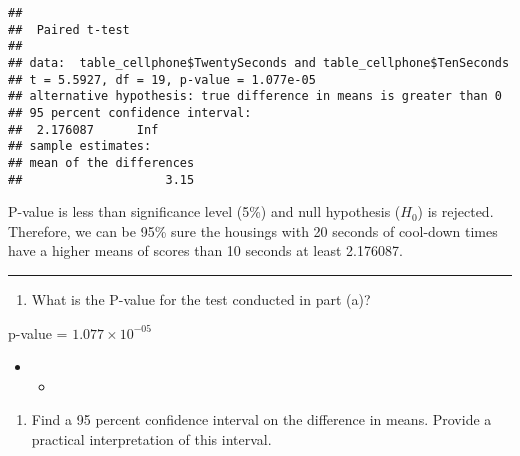 \documentclass[]{article}
\newenvironment{Shaded}{\begin{snugshade}}{\end{snugshade}}
\newcommand{\DataTypeTok}[1]{\textcolor[rgb]{0.13,0.29,0.53}{#1}}
\newcommand{\DecValTok}[1]{\textcolor[rgb]{0.00,0.00,0.81}{#1}}
\newcommand{\FloatTok}[1]{\textcolor[rgb]{0.00,0.00,0.81}{#1}}
\newcommand{\KeywordTok}[1]{\textcolor[rgb]{0.13,0.29,0.53}{\textbf{#1}}}
\newcommand{\NormalTok}[1]{#1}
\newcommand{\OperatorTok}[1]{\textcolor[rgb]{0.81,0.36,0.00}{\textbf{#1}}}
\newcommand{\StringTok}[1]{\textcolor[rgb]{0.31,0.60,0.02}{#1}}
\providecommand{\tightlist}{%
  \setlength{\itemsep}{0pt}\setlength{\parskip}{0pt}}
\begin{document}
\begin{Shaded}
\end{Shaded}

\begin{verbatim}
## 
##  Paired t-test
## 
## data:  table_cellphone$TwentySeconds and table_cellphone$TenSeconds
## t = 5.5927, df = 19, p-value = 1.077e-05
## alternative hypothesis: true difference in means is greater than 0
## 95 percent confidence interval:
##  2.176087      Inf
## sample estimates:
## mean of the differences 
##                    3.15
\end{verbatim}

P-value is less than significance level (5\%) and null hypothesis
(\(H_0\)) is rejected. Therefore, we can be 95\% sure the housings with
20 seconds of cool-down times have a higher means of scores than 10
seconds at least 2.176087.

\begin{center}\rule{0.5\linewidth}{\linethickness}\end{center}

\begin{enumerate}
\def\labelenumi{(\alph{enumi})}
\setcounter{enumi}{1}
\tightlist
\item
  What is the P-value for the test conducted in part (a)?
\end{enumerate}

p-value = \(1.077\times10^{-05}\)

\begin{itemize}
\item
  \begin{itemize}
  \item
  \end{itemize}
\end{itemize}

\begin{enumerate}
\def\labelenumi{(\alph{enumi})}
\setcounter{enumi}{2}
\tightlist
\item
  Find a 95 percent confidence interval on the difference in means.
  Provide a practical interpretation of this interval.
\end{enumerate}
\end{document}
